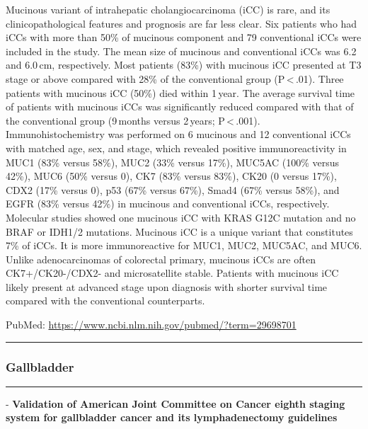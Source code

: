 \documentclass[]{article}
\begin{document}
Mucinous variant of intrahepatic cholangiocarcinoma (iCC) is rare, and
its clinicopathological features and prognosis are far less clear. Six
patients who had iCCs with more than 50\% of mucinous component and 79
conventional iCCs were included in the study. The mean size of mucinous
and conventional iCCs was 6.2 and 6.0\,cm, respectively. Most patients
(83\%) with mucinous iCC presented at T3 stage or above compared with
28\% of the conventional group (P\,\textless{}\,.01). Three patients
with mucinous iCC (50\%) died within 1\,year. The average survival time
of patients with mucinous iCCs was significantly reduced compared with
that of the conventional group (9\,months versus 2\,years;
P\,\textless{}\,.001). Immunohistochemistry was performed on 6 mucinous
and 12 conventional iCCs with matched age, sex, and stage, which
revealed positive immunoreactivity in MUC1 (83\% versus 58\%), MUC2
(33\% versus 17\%), MUC5AC (100\% versus 42\%), MUC6 (50\% versus 0),
CK7 (83\% versus 83\%), CK20 (0 versus 17\%), CDX2 (17\% versus 0), p53
(67\% versus 67\%), Smad4 (67\% versus 58\%), and EGFR (83\% versus
42\%) in mucinous and conventional iCCs, respectively. Molecular studies
showed one mucinous iCC with KRAS G12C mutation and no BRAF or IDH1/2
mutations. Mucinous iCC is a unique variant that constitutes 7\% of
iCCs. It is more immunoreactive for MUC1, MUC2, MUC5AC, and MUC6. Unlike
adenocarcinomas of colorectal primary, mucinous iCCs are often
CK7+/CK20-/CDX2- and microsatellite stable. Patients with mucinous iCC
likely present at advanced stage upon diagnosis with shorter survival
time compared with the conventional counterparts.

PubMed: \url{https://www.ncbi.nlm.nih.gov/pubmed/?term=29698701}

{}

{}

\begin{center}\rule{0.5\linewidth}{\linethickness}\end{center}

\hypertarget{gallbladder}{%
\subsubsection{Gallbladder}\label{gallbladder}}

\begin{center}\rule{0.5\linewidth}{\linethickness}\end{center}

 - \textbf{Validation of American Joint Committee on Cancer eighth
staging system for gallbladder cancer and its lymphadenectomy
guidelines}
\end{document}
